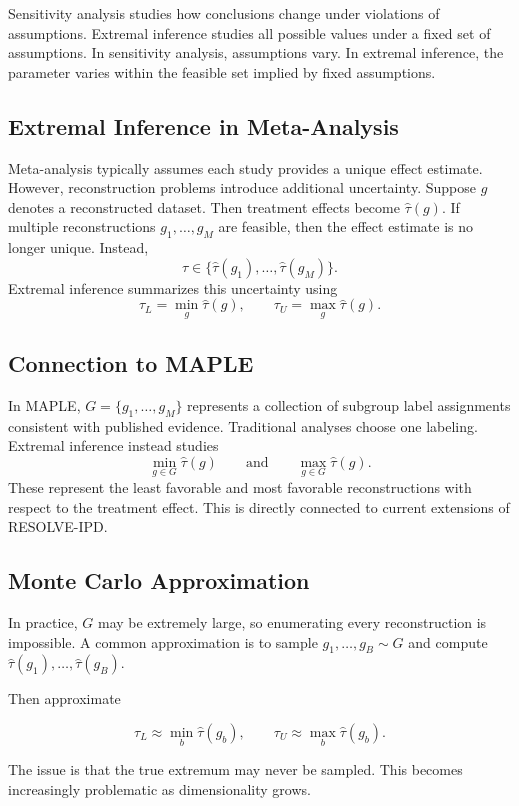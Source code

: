 \documentclass[11pt]{article}
\begin{document}
Sensitivity analysis studies how conclusions change under violations of assumptions.
Extremal inference studies all possible values under a fixed set of assumptions.
In sensitivity analysis, assumptions vary. In extremal inference, the parameter varies within the feasible set implied by fixed assumptions.

\subsection*{Extremal Inference in Meta-Analysis}

Meta-analysis typically assumes each study provides a unique effect estimate. However, reconstruction problems introduce additional uncertainty.
Suppose $g$ denotes a reconstructed dataset. Then treatment effects become $\hat{\tau}(g)$.
If multiple reconstructions $g_1,\ldots,g_M$ are feasible, then the effect estimate is no longer unique. Instead,
\[\tau\in\{\hat{\tau}(g_1),\ldots,\hat{\tau}(g_M)\}.\]
Extremal inference summarizes this uncertainty using
\[\tau_L=\min_g\hat{\tau}(g),\qquad \tau_U=\max_g\hat{\tau}(g).\]

\subsection*{Connection to MAPLE}

In MAPLE, $G=\{g_1,\ldots,g_M\}$ represents a collection of subgroup label assignments consistent with published evidence.
Traditional analyses choose one labeling.
Extremal inference instead studies
\[\min_{g\in G}\hat{\tau}(g)\qquad\text{and}\qquad\max_{g\in G}\hat{\tau}(g).\]
These represent the least favorable and most favorable reconstructions with respect to the treatment effect.
This is directly connected to current extensions of RESOLVE-IPD.

\subsection*{Monte Carlo Approximation}

In practice, $G$ may be extremely large, so enumerating every reconstruction is impossible.
A common approximation is to sample $g_1,\ldots,g_B\sim G$ and compute $\hat{\tau}(g_1),\ldots,\hat{\tau}(g_B)$.

Then approximate

\[\tau_L\approx\min_b\hat{\tau}(g_b),\qquad \tau_U\approx\max_b\hat{\tau}(g_b).\]

The issue is that the true extremum may never be sampled. This becomes increasingly problematic as dimensionality grows.
\end{document}
